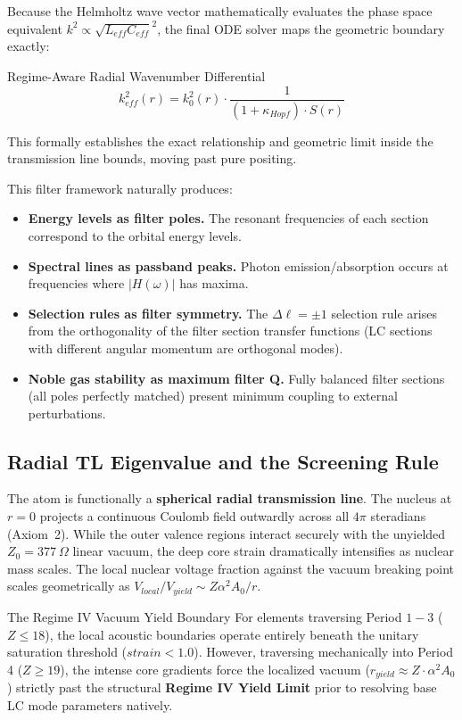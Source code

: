 Because the Helmholtz wave vector mathematically evaluates the phase space equivalent $k^2 \propto \sqrt{L_{eff}C_{eff}}^2$, the final ODE solver maps the geometric boundary exactly:
\begin{resultbox}{Regime-Aware Radial Wavenumber Differential}
\begin{equation}
    k^2_{eff}(r) = k_0^2(r) \cdot \frac{1}{(1 + \kappa_{Hopf}) \cdot S(r)}
\end{equation}
\end{resultbox}
This formally establishes the exact relationship and geometric limit inside the transmission line bounds, moving past pure positing. 

This filter framework naturally produces:
\begin{itemize}
    \item \textbf{Energy levels as filter poles.} The resonant frequencies of each section correspond to the orbital energy levels.
    \item \textbf{Spectral lines as passband peaks.} Photon emission/absorption occurs at frequencies where $|H(\omega)|$ has maxima.
    \item \textbf{Selection rules as filter symmetry.} The $\Delta \ell = \pm 1$ selection rule arises from the orthogonality of the filter section transfer functions (LC sections with different angular momentum are orthogonal modes).
    \item \textbf{Noble gas stability as maximum filter Q.} Fully balanced filter sections (all poles perfectly matched) present minimum coupling to external perturbations.
\end{itemize}

\subsection{Radial TL Eigenvalue and the Screening Rule}
\label{sec:radial_tl_eigenvalue}

The atom is functionally a \textbf{spherical radial transmission line}.
The nucleus at $r = 0$ projects a continuous Coulomb field outwardly across all $4\pi$ steradians (Axiom~2). 
While the outer valence regions interact securely with the unyielded $Z_0 = 377~\Omega$ linear vacuum, the deep core strain dramatically intensifies as nuclear mass scales. The local nuclear voltage fraction against the vacuum breaking point scales geometrically as $V_{local}/V_{yield} \sim Z\alpha^2A_0 / r$.

\begin{resultbox}{The Regime IV Vacuum Yield Boundary}
For elements traversing Period $1-3$ ($Z \le 18$), the local acoustic boundaries operate entirely beneath the unitary saturation threshold ($strain < 1.0$). However, traversing mechanically into Period 4 ($Z \ge 19$), the intense core gradients force the localized vacuum ($r_{yield} \approx Z \cdot \alpha^2 A_0$) strictly past the structural \textbf{Regime IV Yield Limit} prior to resolving base LC mode parameters natively.
\end{resultbox}

